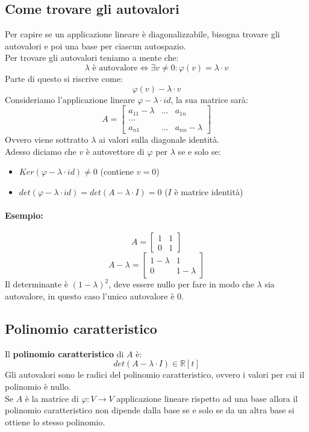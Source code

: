 \documentclass[12pt,a4paper]{article}
\begin{document}
\subsection{Come trovare gli autovalori}
Per capire se un applicazione lineare è diagonalizzabile, bisogna trovare gli autovalori e poi una base per ciascun autospazio.\\
Per trovare gli autovalori teniamo a mente che:
\[
\lambda \text{ è autovalore} \Leftrightarrow \exists v \ne 0 : \varphi(v) = \lambda \cdot v
\]
Parte di questo si riscrive come:
\[
\varphi(v) - \lambda \cdot v
\]
Consideriamo l'applicazione lineare $\varphi - \lambda \cdot id$, la sua matrice sarà:
\[
A = \begin{bmatrix}
  a_{11} - \lambda & \ldots & a_{1n}\\
  \ldots\\
  a_{n1} & \ldots & a_{nn} - \lambda
\end{bmatrix}
\]
Ovvero viene sottratto $\lambda$ ai valori sulla diagonale identità.\\
Adesso diciamo che $v$ è autovettore di $\varphi$ per $\lambda$ se e solo se:
\begin{itemize}
  \item $Ker(\varphi - \lambda \cdot id) \ne 0$ (contiene $v = 0$)
  \item $det(\varphi - \lambda \cdot id) = det(A - \lambda \cdot I) = 0$ ($I$ è matrice identità) 
\end{itemize}
\paragraph{Esempio:}
\[ A = 
\begin{bmatrix}
  1 & 1\\
  0 & 1
\end{bmatrix}
\]
\[
A - \lambda = \begin{bmatrix}
  1 - \lambda & 1\\
  0 & 1 - \lambda
\end{bmatrix}
\]
Il determinante è $(1-\lambda)^2$, deve essere nullo per fare in modo che $\lambda$ sia autovalore, in questo caso l'unico autovalore è $0$.
\subsection{Polinomio caratteristico}
Il \textbf{polinomio caratteristico} di $A$ è:
\[
det(A - \lambda \cdot I) \in \mathbb{R}[t]
\]
Gli autovalori sono le radici del polinomio caratteristico, ovvero i valori per cui il polinomio è nullo.\\
Se $A$ è la matrice di $\varphi:V \to V$ applicazione lineare rispetto ad una base allora il polinomio caratteristico non dipende dalla base se e solo se da un altra base si ottiene lo stesso polinomio.
\end{document}
